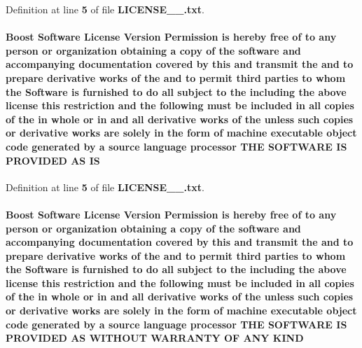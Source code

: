 Definition at line {\bf 5} of file {\bf L\+I\+C\+E\+N\+S\+E\+\_\+\_.\+txt}.

\paragraph[{IS}]{\setlength{\rightskip}{0pt plus 5cm}Boost {\bf Software} License Version Permission is hereby free of to any person or organization obtaining a copy of the software and accompanying documentation covered by this and transmit the and to prepare derivative works of the and to permit third parties to whom the {\bf Software} is furnished to do {\bf all} subject to the including the above {\bf license} this restriction and the {\bf following} must be included in {\bf all} copies of the in whole or in and {\bf all} derivative works of the unless such copies or derivative works are solely in the form of machine executable object code generated by a source language processor T\+HE S\+O\+F\+T\+W\+A\+RE IS P\+R\+O\+V\+I\+D\+ED AS IS}\label{LICENSE__1__0_8txt_a035debe469763088177b6e34e5623617}


Definition at line {\bf 5} of file {\bf L\+I\+C\+E\+N\+S\+E\+\_\+\_.\+txt}.

\paragraph[{K\+I\+ND}]{\setlength{\rightskip}{0pt plus 5cm}Boost {\bf Software} License Version Permission is hereby free of to any person or organization obtaining a copy of the software and accompanying documentation covered by this and transmit the and to prepare derivative works of the and to permit third parties to whom the {\bf Software} is furnished to do {\bf all} subject to the including the above {\bf license} this restriction and the {\bf following} must be included in {\bf all} copies of the in whole or in and {\bf all} derivative works of the unless such copies or derivative works are solely in the form of machine executable object code generated by a source language processor T\+HE S\+O\+F\+T\+W\+A\+RE {\bf IS} P\+R\+O\+V\+I\+D\+ED AS W\+I\+T\+H\+O\+UT W\+A\+R\+R\+A\+N\+TY OF A\+NY K\+I\+ND}\label{LICENSE__1__0_8txt_ad23bd01d3cef86aed98079d826a6eb3d}


